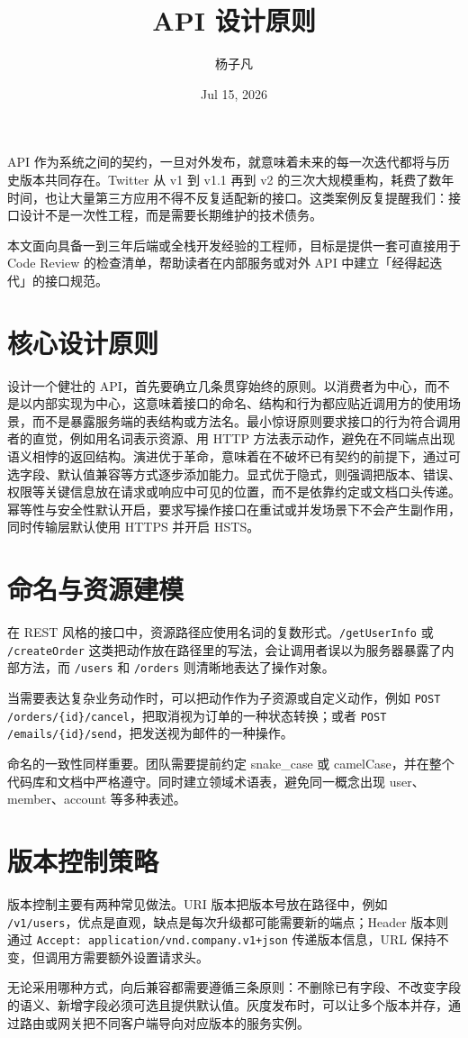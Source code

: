 \title{API 设计原则}
\author{杨子凡}
\date{Jul 15, 2026}
\maketitle
API 作为系统之间的契约，一旦对外发布，就意味着未来的每一次迭代都将与历史版本共同存在。Twitter 从 v1 到 v1.1 再到 v2 的三次大规模重构，耗费了数年时间，也让大量第三方应用不得不反复适配新的接口。这类案例反复提醒我们：接口设计不是一次性工程，而是需要长期维护的技术债务。\par
本文面向具备一到三年后端或全栈开发经验的工程师，目标是提供一套可直接用于 Code Review 的检查清单，帮助读者在内部服务或对外 API 中建立「经得起迭代」的接口规范。\par
\chapter{核心设计原则}
设计一个健壮的 API，首先要确立几条贯穿始终的原则。以消费者为中心，而不是以内部实现为中心，这意味着接口的命名、结构和行为都应贴近调用方的使用场景，而不是暴露服务端的表结构或方法名。最小惊讶原则要求接口的行为符合调用者的直觉，例如用名词表示资源、用 HTTP 方法表示动作，避免在不同端点出现语义相悖的返回结构。演进优于革命，意味着在不破坏已有契约的前提下，通过可选字段、默认值兼容等方式逐步添加能力。显式优于隐式，则强调把版本、错误、权限等关键信息放在请求或响应中可见的位置，而不是依靠约定或文档口头传递。幂等性与安全性默认开启，要求写操作接口在重试或并发场景下不会产生副作用，同时传输层默认使用 HTTPS 并开启 HSTS。\par
\chapter{命名与资源建模}
在 REST 风格的接口中，资源路径应使用名词的复数形式。\texttt{/getUserInfo} 或 \texttt{/createOrder} 这类把动作放在路径里的写法，会让调用者误以为服务器暴露了内部方法，而 \texttt{/users} 和 \texttt{/orders} 则清晰地表达了操作对象。\par
当需要表达复杂业务动作时，可以把动作作为子资源或自定义动作，例如 \texttt{POST /orders/\{{}id\}{}/cancel}，把取消视为订单的一种状态转换；或者 \texttt{POST /emails/\{{}id\}{}/send}，把发送视为邮件的一种操作。\par
命名的一致性同样重要。团队需要提前约定 snake\_{}case 或 camelCase，并在整个代码库和文档中严格遵守。同时建立领域术语表，避免同一概念出现 user、member、account 等多种表述。\par
\chapter{版本控制策略}
版本控制主要有两种常见做法。URI 版本把版本号放在路径中，例如 \texttt{/v1/users}，优点是直观，缺点是每次升级都可能需要新的端点；Header 版本则通过 \texttt{Accept: application/vnd.company.v1+json} 传递版本信息，URL 保持不变，但调用方需要额外设置请求头。\par
无论采用哪种方式，向后兼容都需要遵循三条原则：不删除已有字段、不改变字段的语义、新增字段必须可选且提供默认值。灰度发布时，可以让多个版本并存，通过路由或网关把不同客户端导向对应版本的服务实例。\par
